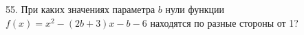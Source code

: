 55. При каких значениях параметра $b$ нули функции $f(x)=x^2-(2b+3)x-b-6$ находятся по разные стороны от 1?\\
